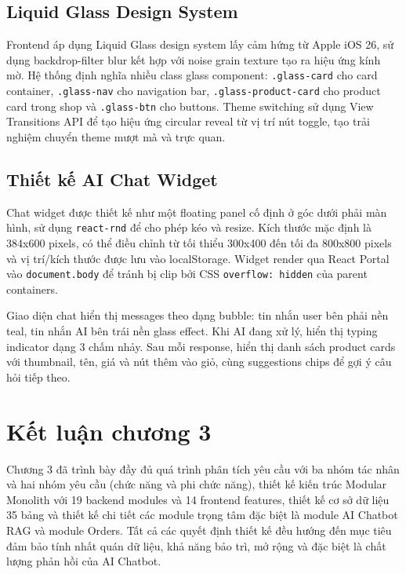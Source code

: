 \subsection{Liquid Glass Design System}

Frontend áp dụng Liquid Glass design system lấy cảm hứng từ Apple iOS 26, sử dụng backdrop-filter blur kết hợp với noise grain texture tạo ra hiệu ứng kính mờ. Hệ thống định nghĩa nhiều class glass component: \texttt{.glass-card} cho card container, \texttt{.glass-nav} cho navigation bar, \texttt{.glass-product-card} cho product card trong shop và \texttt{.glass-btn} cho buttons. Theme switching sử dụng View Transitions API để tạo hiệu ứng circular reveal từ vị trí nút toggle, tạo trải nghiệm chuyển theme mượt mà và trực quan.

\subsection{Thiết kế AI Chat Widget}

Chat widget được thiết kế như một floating panel cố định ở góc dưới phải màn hình, sử dụng \texttt{react-rnd} để cho phép kéo và resize. Kích thước mặc định là 384x600 pixels, có thể điều chỉnh từ tối thiểu 300x400 đến tối đa 800x800 pixels và vị trí/kích thước được lưu vào localStorage. Widget render qua React Portal vào \texttt{document.body} để tránh bị clip bởi CSS \texttt{overflow: hidden} của parent containers.

Giao diện chat hiển thị messages theo dạng bubble: tin nhắn user bên phải nền teal, tin nhắn AI bên trái nền glass effect. Khi AI đang xử lý, hiển thị typing indicator dạng 3 chấm nhảy. Sau mỗi response, hiển thị danh sách product cards với thumbnail, tên, giá và nút thêm vào giỏ, cùng suggestions chips để gợi ý câu hỏi tiếp theo.

\section*{Kết luận chương 3}

Chương 3 đã trình bày đầy đủ quá trình phân tích yêu cầu với ba nhóm tác nhân và hai nhóm yêu cầu (chức năng và phi chức năng), thiết kế kiến trúc Modular Monolith với 19 backend modules và 14 frontend features, thiết kế cơ sở dữ liệu 35 bảng và thiết kế chi tiết các module trọng tâm đặc biệt là module AI Chatbot RAG và module Orders. Tất cả các quyết định thiết kế đều hướng đến mục tiêu đảm bảo tính nhất quán dữ liệu, khả năng bảo trì, mở rộng và đặc biệt là chất lượng phản hồi của AI Chatbot.
